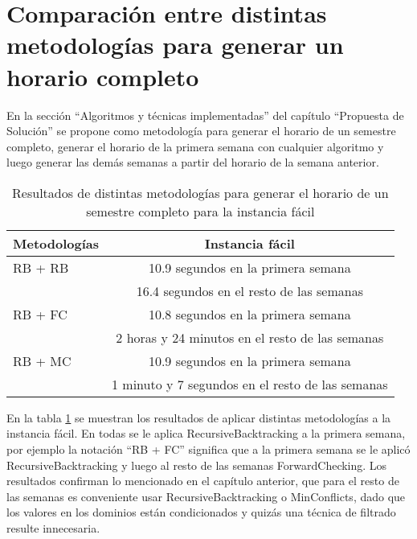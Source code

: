 \section{Comparaci\'on entre distintas metodolog\'ias para generar un horario completo}

En la secci\'on ``Algoritmos y t\'ecnicas implementadas'' del cap\'itulo ``Propuesta de Solución'' se propone como metodolog\'ia para generar el horario de un semestre completo, generar el horario de la primera semana con cualquier algoritmo y luego generar las dem\'as semanas a partir del horario de la semana anterior.

\begin{table}[h]
	\caption{Resultados de distintas metodolog\'ias para generar el horario de un semestre completo para la instancia f\'acil}
	\begin{center}
		\label{semestre}
		\begin{tabular}{|l|c||}
			\hline \hline
			\textbf{Metodolog\'ias} & \textbf{Instancia f\'acil} \\ \hline
			RB + RB & 10.9 segundos en la primera semana \\
			 & 16.4 segundos en el resto de las semanas \\ \hline
			RB + FC & 10.8 segundos en la primera semana \\
			 & 2 horas y 24 minutos en el resto de las semanas \\ \hline
			RB + MC & 10.9 segundos en la primera semana \\
			 & 1 minuto y 7 segundos en el resto de las semanas \\ \hline
		\end{tabular}
	\end{center}
\end{table}

En la tabla \ref{semestre} se muestran los resultados de aplicar distintas metodolog\'ias a la instancia f\'acil. En todas se le aplica \textsf{RecursiveBacktracking} a la primera semana, por ejemplo la notaci\'on ``RB + FC'' significa que a la primera semana se le aplic\'o \textsf{RecursiveBacktracking} y luego al resto de las semanas \textsf{ForwardChecking}. Los resultados confirman lo mencionado en el cap\'itulo anterior, que para el resto de las semanas es conveniente usar \textsf{RecursiveBacktracking} o \textsf{MinConflicts}, dado que los valores en los dominios est\'an condicionados y quiz\'as una t\'ecnica de filtrado resulte innecesaria.


